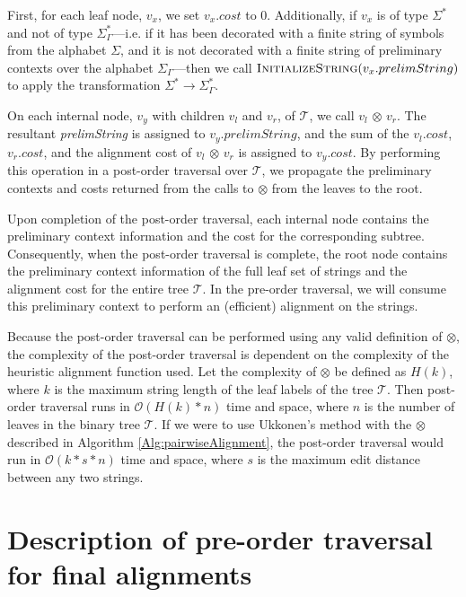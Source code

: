 \documentclass{bmcart}
\begin{document}
First, for each leaf node, $v_x$, we set $v_x.cost$ to $0$.
Additionally, if $v_x$ is of type $\Sigma^{*}$ and not of type $\Sigma^{*}_{\Gamma}$---i.e. if it has been decorated with a finite string of symbols from the alphabet $\Sigma$, and it is not decorated with a finite string of preliminary contexts over the alphabet $\Sigma_{\Gamma}$---then we call $\Call{InitializeString}{v_x.prelimString}$ to apply the transformation $\Sigma^{*} \rightarrow \Sigma^{*}_{\Gamma}$.

On each internal node, $v_y$ with children $v_l$ and $v_r$, of $\mathcal{T}$, we call $v_l$ $\otimes$ $v_r$.
The resultant \textit{prelimString} is assigned to $v_y.prelimString$, and the sum of the $v_l.cost$, $v_r.cost$, and the alignment cost of $v_l$ $\otimes$ $v_r$ is assigned to $v_y.cost$.
By performing this operation in a post-order traversal over $\mathcal{T}$, we propagate the preliminary contexts and costs returned from the calls to $\otimes$ from the leaves to the root.

Upon completion of the post-order traversal, each internal node contains the preliminary context information and the cost for the corresponding subtree.
Consequently, when the post-order traversal is complete, the root node contains the preliminary context information of the full leaf set of strings and the alignment cost for the entire tree $\mathcal{T}$.
In the pre-order traversal, we will consume this preliminary context to perform an (efficient) alignment on the strings.

Because the post-order traversal can be performed using any valid definition of $\otimes$, the complexity of the post-order traversal is dependent on the complexity of the heuristic alignment function used.
Let the complexity of $\otimes$ be defined as $H(k)$, where $k$ is the maximum string length of the leaf labels of the tree $\mathcal{T}$.
Then post-order traversal runs in $\mathcal{O}(H(k) * n)$ time and space, where $n$ is the number of leaves in the binary tree $\mathcal{T}$.
If we were to use Ukkonen's method with the $\otimes$ described in Algorithm \ref{Alg:pairwiseAlignment}, the post-order traversal would run in $\mathcal{O}(k * s * n)$ time and space, where $s$ is the maximum edit distance between any two strings.


\section*{Description of pre-order traversal for final alignments}
\end{document}
